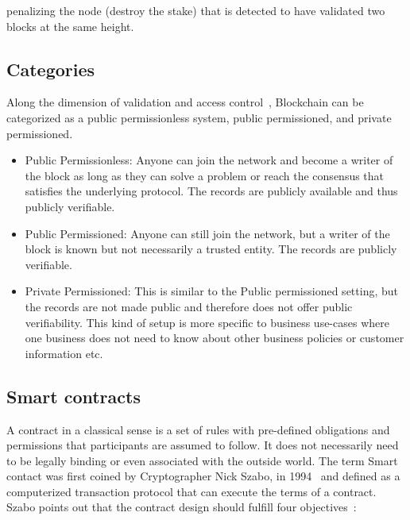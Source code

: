 penalizing the node (destroy the stake) that is detected to have validated two
blocks at the same height.
\subsection{Categories}
Along the dimension of validation and access control~\cite{voronchenko2017you},
Blockchain can be categorized as a public permissionless system, public
permissioned, and private permissioned. 
\begin{itemize}
	\item Public Permissionless: Anyone can join the network and become a writer
		of the block as long as they can solve a problem or reach the consensus
		that satisfies the underlying protocol. The records are publicly
		available and thus publicly verifiable. 
	\item Public Permissioned: Anyone can still join the network, but a writer
		of the block is known but not necessarily a trusted entity. The records
		are publicly verifiable. 
	\item Private Permissioned: This is similar to the Public permissioned
		setting, but the records are not made public and therefore does not
		offer public verifiability. This kind of setup is more specific to
		business use-cases where one business does not need to know about other
		business policies or customer information etc. 
\end{itemize}
\subsection{Smart contracts}
A contract in a classical sense is a set of rules with pre-defined obligations
and permissions that participants are assumed to follow. It does not
necessarily need to be legally binding or even associated with the outside
world. The term Smart contact was first coined by Cryptographer Nick Szabo, in
1994~\cite{SzaboSmart1994} and defined as a computerized transaction protocol
that can execute the terms of a contract. Szabo points out that the contract
design should fulfill four objectives~\cite{szabo1996smart}: 
